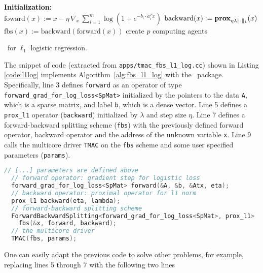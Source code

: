\begin{algorithm}[H]\label{alg:fbs_l1_log}
\DontPrintSemicolon
  \textbf{Initialization:} \\
  \quad $\text{foward}(x) := x - \eta \, \nabla_x \,\sum_{i = 1}^m \log (1 + e^{-b_i \cdot a_i^T x})$  
  \quad $\text{backward}(x) := \mathbf{prox}_{\eta \lambda  \|\cdot\|_1} (x)$ 
  \quad $\text{fbs}(x) := \text{backward}(\text{forward}(x))$ 
  \quad create $p$ computing agents \\
  \caption{\pkg~for $\ell_1$ logistic regression.}
\end{algorithm}
The snippet of code (extracted from
\texttt{apps/tmac\_fbs\_l1\_log.cc}) shown in Listing \ref{code:l1log} implements Algorithm~\ref{alg:fbs_l1_log} with the \pkg~package.
Specifically, line 3 defines \texttt{forward} as an operator of type \texttt{forward\_grad\_for\_log\_loss<SpMat>}
initialized by the pointers to the data \texttt{A}, which is a sparse matrix, and label \texttt{b}, which is a dense vector. Line 5  defines a
\texttt{prox\_l1} operator (\texttt{backward}) initialized by $\lambda$ and step size $\eta$.
Line 7 defines a forward-backward splitting scheme (\texttt{fbs}) with the previously defined forward operator,
backward operator and the address of the unknown variable \texttt{x}. Line 9 calls the multicore driver
\texttt{TMAC} on the \texttt{fbs} scheme and some user specified parameters (\texttt{params}).
\begin{lstlisting}[caption={example code},label=code:l1log,language=C++]
  // [...] parameters are defined above
  // forward operator: gradient step for logistic loss
  forward_grad_for_log_loss<SpMat> forward(&A, &b, &Atx, eta);
  // backward operator: proximal operator for l1 norm
  prox_l1 backward(eta, lambda);
  // forward-backward splitting scheme
  ForwardBackwardSplitting<forward_grad_for_log_loss<SpMat>, prox_l1>
    fbs(&x, forward, backward);
  // the multicore driver
  TMAC(fbs, params);
\end{lstlisting}
One can easily adapt the previous code to solve other problems, for example, replacing lines 5 through 7 with
the following two lines
